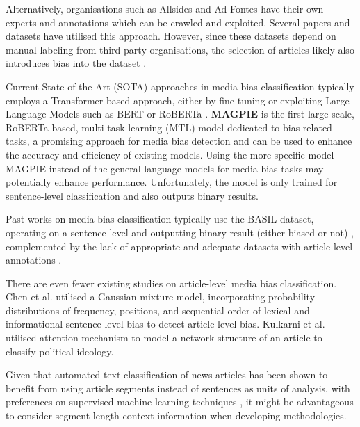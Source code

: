 Alternatively, organisations such as Allsides and Ad Fontes have their own experts and annotations which can be crawled and exploited. Several papers and datasets \cite{spinde-2023-bat,chen-2020-nlpcss,kulkarni-2018-multi-view} have utilised this approach. However, since these datasets depend on manual labeling from third-party organisations, the selection of articles likely also introduces bias into the dataset \cite{spinde-2023-bat}.

Current State-of-the-Art (SOTA) approaches in media bias classification typically employs a Transformer-based approach, either by fine-tuning or exploiting Large Language Models such as BERT \cite{devlin-2019-bert} or RoBERTa \cite{liu-2019-roberta}. \textbf{MAGPIE} \cite{horych-2024-magpie} is the first large-scale, RoBERTa-based, multi-task learning (MTL) model dedicated to bias-related tasks, a promising approach for media bias detection and can be used to enhance the accuracy and efficiency of existing models. Using the more specific model MAGPIE instead of the general language models for media bias tasks may potentially enhance performance. Unfortunately, the model is only trained for sentence-level classification and also outputs binary results.

Past works on media bias classification typically use the BASIL dataset, operating on a sentence-level and outputting binary result (either biased or not) \cite{maab-2023-lexical-bias-detection, maab-2023-target-aware, guo-2022-modeling, van-den-berg-2020-context,lee-2021-unifying,lei-2022-sentence,lei-2024-event-relation}, complemented by the lack of appropriate and adequate datasets with article-level annotations \cite{demidov-2023-political-bias-classification}.

There are even fewer existing studies on article-level media bias classification. Chen et al. \cite{chen-2020-detecting-media-bias-gaussian} utilised a Gaussian mixture model, incorporating probability distributions of frequency, positions, and sequential order of lexical and informational sentence-level bias to detect article-level bias. Kulkarni et al. \cite{kulkarni-2018-multi-view} utilised attention mechanism to model a network structure of an article to classify political ideology.

Given that automated text classification of news articles has been shown to benefit from using article segments instead of sentences as units of analysis, with preferences on supervised machine learning techniques \cite{barbera-2021-article-classification}, it might be advantageous to consider segment-length context information when developing methodologies.

